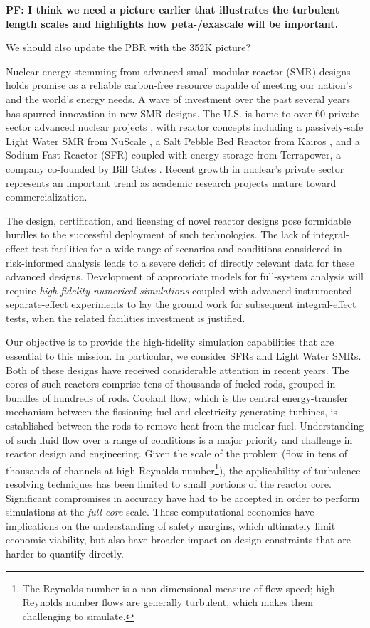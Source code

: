 

{\bf
PF:  I think we need a picture earlier that illustrates the turbulent
length scales and highlights how peta-/exascale will be important.

We should also update the PBR with the 352K picture?

}

Nuclear energy stemming from advanced small modular reactor (SMR) designs
holds promise as a reliable carbon-free resource capable of meeting our
nation's and the world's energy needs.  A wave of investment over the past
several years has spurred innovation in new SMR designs. 
The U.S. is home to over 60 private sector advanced nuclear projects \cite{third_way},
with reactor concepts including a passively-safe Light Water SMR from NuScale \cite{nuscale},
a Salt Pebble Bed Reactor from Kairos \cite{kairos},
and a Sodium Fast Reactor (SFR) coupled with energy storage from Terrapower, 
a company co-founded by Bill Gates \cite{natrium}. Recent growth in nuclear's private
sector represents an important trend as academic research projects mature
toward commercialization.

The design, certification, and licensing of novel reactor designs pose
formidable hurdles to the successful deployment of such technologies. 
The lack of integral-effect test facilities for a wide range of scenarios and
conditions considered in risk-informed analysis leads to a severe deficit of
directly relevant data for these advanced designs.  Development of  appropriate
models for full-system analysis will require {\em high-fidelity numerical
simulations} coupled with advanced instrumented separate-effect experiments to
lay the ground work for subsequent integral-effect tests, when the related
facilities investment is justified.

Our objective is to provide the high-fidelity simulation capabilities that are
essential to this mission.  In particular, we consider SFRs and Light Water SMRs.
Both of these designs have received considerable
attention in recent years. The cores of such reactors comprise tens of
thousands of fueled rods, grouped in bundles of hundreds of rods. Coolant flow,
which is the central energy-transfer mechanism between the fissioning fuel and
electricity-generating turbines, is established between the rods to remove heat
from the nuclear fuel.  Understanding of such fluid flow over a range of
conditions is a major priority and challenge in reactor design and engineering.
Given the scale of the problem (flow in tens of thousands of channels at high
Reynolds number\footnote{The Reynolds number is a non-dimensional measure of flow
speed; high Reynolds number flows are generally turbulent, which makes them
challenging to simulate.}), the
applicability of turbulence-resolving techniques has been limited to small
portions of the reactor core. Significant compromises in accuracy have had to
be accepted in order to perform simulations at the {\em full-core} scale.
These computational economies have implications on the understanding of safety
margins, which ultimately limit economic viability, but also have broader impact
on design constraints that are harder to quantify directly.

